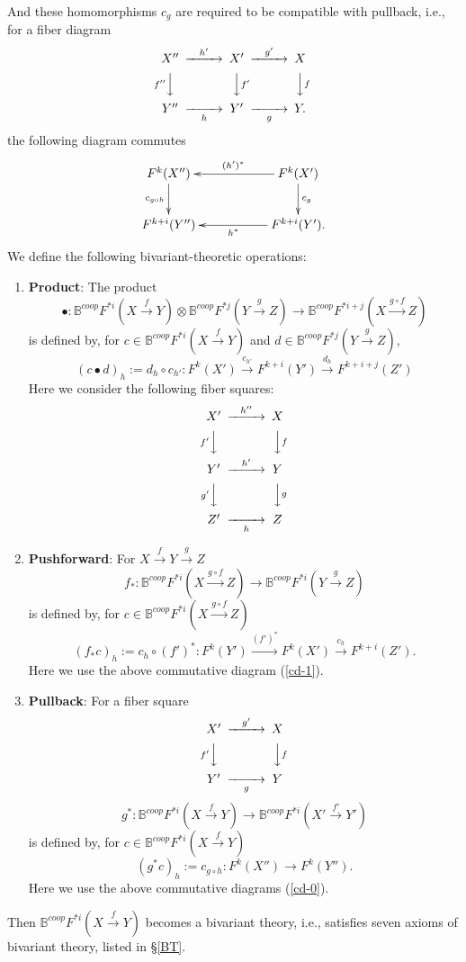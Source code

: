 \documentclass[a4paper]{amsart}
\begin{document}
\begin{thm}
And these homomorphisms $c_g$ are
required to be compatible with pullback, i.e., for a fiber diagram
\begin{equation}\label{cd-0}
\CD
X'' @> {h'}  >> X' @> {g'}  >> X\\
@V {f''} VV @VV f'V @VV fV\\
Y'' @>> {h} > Y' @>> {g} > Y.\\
\endCD
\end{equation}
the following diagram commutes
\begin{equation}\label{cd-01}
\xymatrix
{F^k(X'') \ar[d]_{c_{g \circ h}} && F^k(X')\ar[ll]_{(h')^*} \ar[d]^{c_g}\\
F^{k+i}(Y'') && F^{k+i}(Y') \ar[ll]^{h^*}.
}
\end{equation}
We define the following bivariant-theoretic operations:
\begin{enumerate}
\item {\bf Product}: The product
$$\bullet: \mathbb B^{coop}F^{*i}(X \xrightarrow f Y) \otimes \mathbb B^{coop}F^{*j}(Y \xrightarrow g Z) \to \mathbb B^{coop}F^{*i+j}(X \xrightarrow {g \circ f} Z)$$
is defined by, for $c \in \mathbb B^{coop}F^{*i}(X \xrightarrow f Y) $ and $d \in \mathbb B^{coop}F^{*j}(Y \xrightarrow g Z) $,
$$(c \bullet d)_h:= d_h \circ c_{h'}: F^k(X') \xrightarrow {c_{h'}}  F^{k+i}(Y') \xrightarrow {d_h} F^{k+i+j}(Z')$$
Here we consider the following fiber squares:
\begin{equation}\label{cd-1}
\CD
X' @> {h''} >> X \\
@V {f'}VV @VV {f}V\\
Y' @> {h'} >> Y \\
@V {g'}VV @VV {g}V \\
Z'  @>> {h} > Z \endCD 
\end{equation}
\item {\bf Pushforward}: For $X \xrightarrow f Y \xrightarrow g Z$ %
$$f_*: \mathbb B^{coop}F^{*i}(X \xrightarrow {g \circ f} Z) \to \mathbb B^{coop}F^{* i}(Y \xrightarrow g Z)$$
is defined by, for $c \in \mathbb B^{coop}F^{*i}(X \xrightarrow {g \circ f} Z)$ 
$$(f_*c)_h := c_h \circ (f')^*: F^k(Y') \xrightarrow{(f')^*} F^k(X')  \xrightarrow{c_h} F^{k+i}(Z').$$
Here we use the above commutative diagram (\ref{cd-1}).
\item {\bf Pullback}: For a fiber square 
$$\CD
X' @> {g'}  >> X\\
@V {f'} VV @VV fV\\
Y' @>> {g} > Y\\
\endCD
$$
$$g^*: \mathbb B^{coop}F^{* i}(X \xrightarrow f Y ) \to \mathbb B^{coop}F^{* i}(X' \xrightarrow {f'} Y' )$$
is defined by, for $c \in \mathbb B^{coop}F^{*i}(X \xrightarrow f Y) $
$$(g^*c)_h := c_{g \circ h}: F^k(X'') \to F^k(Y'').$$
Here we use the above commutative diagrams (\ref{cd-0}).
\end{enumerate} 
Then $\mathbb B^{coop}F^{* i}(X \xrightarrow f Y)$ %
becomes a bivariant theory, i.e., satisfies seven axioms of bivariant theory, listed in \S \ref{BT}.
\end{thm}
\end{document}
